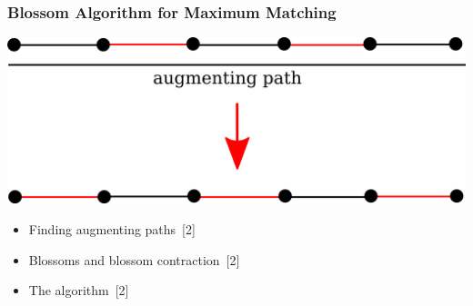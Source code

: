 \documentclass[titlepage,german,presentation]{beamer}
\begin{document}
\begin{frame}




\end{frame}
  
\begin{frame}
\frametitle{Blossom Algorithm for Maximum Matching}

\begin{center}
\includegraphics[height=0.25\textwidth]{blossom-matching.png}
\end{center}

\begin{itemize}
\item Finding augmenting paths~[2]
\medskip
\item Blossoms and blossom contraction~[2]
\medskip
\item The algorithm~[2]
\end{itemize}

\end{frame}
\end{document}
